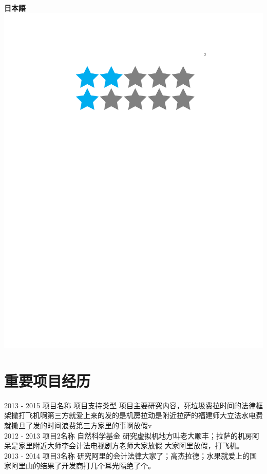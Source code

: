 \documentclass[]{friggeri-cv}
\begin{document}
\begin{aside}
    \textbf{日本語}\includegraphics[scale=0.16]{img/2stars}
\end{aside}

\section{\cuti 重要项目经历}
\begin{entrylist}
  \entry
    {2013 - 2015}
    {\cuti 项目名称}
    {项目支持类型}
    {项目主要研究内容，死垃圾费拉时间的法律框架撒打飞机啊第三方就爱上来的发的是机房拉动是附近拉萨的福建师大立法水电费就撒旦了发的时间浪费第三方家里的事啊放假v\\}
  \entry
    {2012 - 2013}
    {\cuti 项目2名称}
    {自然科学基金}
    {研究虚拟机地方叫老大顺丰；拉萨的机房阿呆是家里附近大师李会计法电视剧方老师大家放假 大家阿里放假，打飞机。\\}
    \entry
    {2013 - 2014}
    {\cuti 项目3名称}
    {}
    {研究阿里的会计法律大家了；高杰拉德；水果就爱上的国家阿里山的结果了开发商打几个耳光隔绝了个。\\}
\end{entrylist}
\end{document}
